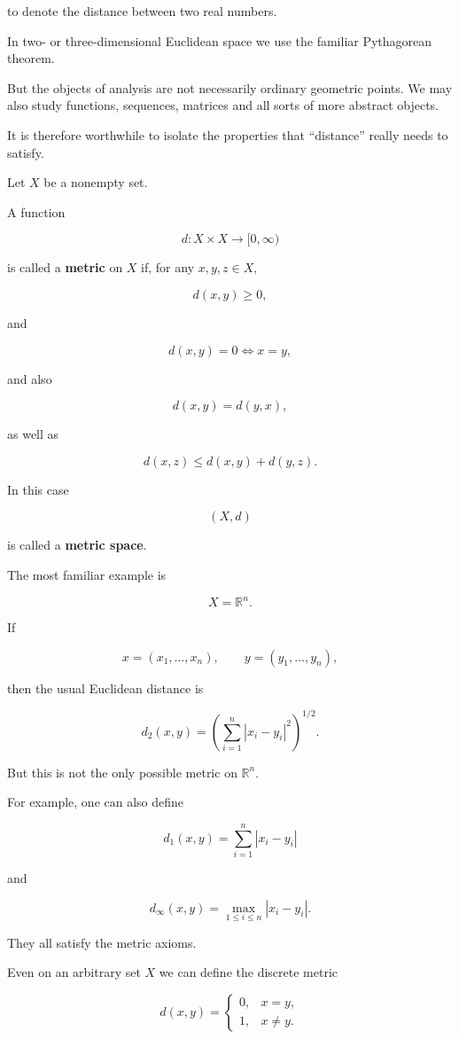 \documentclass[11pt]{article}
\begin{document}
to denote the distance between two real numbers.

In two- or three-dimensional Euclidean space we use the familiar Pythagorean theorem.

But the objects of analysis are not necessarily ordinary geometric points. We may also study functions, sequences, matrices and all sorts of more abstract objects.

It is therefore worthwhile to isolate the properties that ``distance'' really needs to satisfy.

Let $X$ be a nonempty set.

A function

\[
d:X\times X\rightarrow[0,\infty)
\]

is called a \textbf{metric} on $X$ if, for any $x,y,z\in X$,

\[
d(x,y)\geq0,
\]

and

\[
d(x,y)=0\Longleftrightarrow x=y,
\]

and also

\[
d(x,y)=d(y,x),
\]

as well as

\[
d(x,z)\leq d(x,y)+d(y,z).
\]

In this case

\[
(X,d)
\]

is called a \textbf{metric space}.

The most familiar example is

\[
X=\mathbb{R}^{n}.
\]

If

\[
x=(x_{1},\ldots,x_{n}),\qquad y=(y_{1},\ldots,y_{n}),
\]

then the usual Euclidean distance is

\[
d_{2}(x,y)=\left(\sum_{i=1}^{n}|x_{i}-y_{i}|^{2}\right)^{1/2}.
\]

But this is not the only possible metric on $\mathbb{R}^{n}$.

For example, one can also define

\[
d_{1}(x,y)=\sum_{i=1}^{n}|x_{i}-y_{i}|
\]

and

\[
d_{\infty}(x,y)=\max_{1\leq i\leq n}|x_{i}-y_{i}|.
\]

They all satisfy the metric axioms.

Even on an arbitrary set $X$ we can define the discrete metric

\[
d(x,y)=\begin{cases}0, & x=y,\\ 1, & x\ne y.\end{cases}
\]
\end{document}
